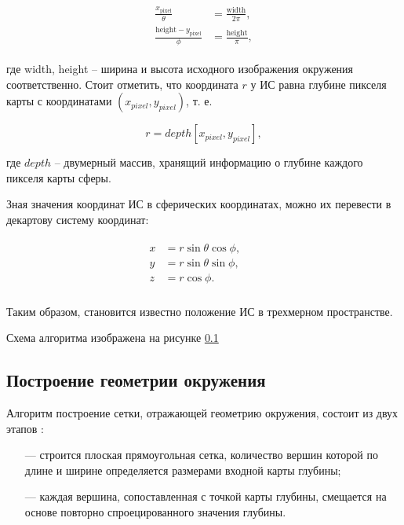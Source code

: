 \begin{equation}
	\begin{aligned}
		\begin{split}
			\frac{x_{\text{pixel}}}{\theta} &= \frac{\text{width}}{2\pi}, \\
			\frac{\text{height} - y_{\text{pixel}}}{\phi} &= \frac{\text{height}}{\pi}, 
		\end{split}
	\end{aligned}
\end{equation}

где width, height -- ширина и высота исходного изображения окружения соответственно. Стоит отметить, что координата $r$ у ИС равна глубине пикселя карты с координатами $(x_{pixel}, y_{pixel})$, т. е. 

\begin{equation}
	r = depth[x_{pixel}, y_{pixel}],
\end{equation}
 
где $depth$ -- двумерный массив, хранящий информацию о глубине каждого пикселя карты сферы.

Зная значения координат ИС в сферических координатах, можно их перевести в декартову систему координат:

\begin{equation}
	\begin{aligned}
		\begin{split}
			x &= r \sin\theta \cos\phi, &&\\
			y &= r \sin\theta \sin\phi, &&\\
			z &= r \cos\phi. &&\\
		\end{split}
	\end{aligned}
\end{equation}

Таким образом, становится известно положение ИС в трехмерном пространстве.

Схема алгоритма изображена на рисунке \ref{}


\subsection{Построение геометрии окружения}

Алгоритм построение сетки, отражающей геометрию окружения, состоит из двух этапов \cite{du2020depthlab}: 

\begin{itemize}
	\item[---] строится плоская прямоугольная сетка, количество вершин которой по длине и ширине определяется размерами входной карты глубины;
	\item[---] каждая вершина, сопоставленная с точкой карты глубины, смещается на основе повторно спроецированного значения глубины.
\end{itemize}

